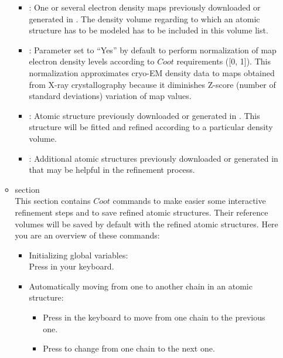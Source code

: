 \begin{itemize}
\begin{itemize}
    \begin{itemize}
     \item {}: One or several electron density maps previously downloaded or generated in \scipion. The density volume regarding to which an atomic structure has to be modeled has to be included in this volume list.\\
     \item {}: Parameter set to ``Yes'' by default to perform normalization of map electron density levels according to $Coot$ requirements ([0, 1]). This normalization approximates cryo-EM density data to maps obtained from X-ray crystallography because it diminishes Z-score (number of standard deviations) variation of map values.\\  
     \item {}: Atomic structure previously downloaded or generated in \scipion. This structure will be fitted and refined according to a particular density volume.\\
     \item {}: Additional atomic structures previously downloaded or generated in \scipion that may be helpful in the refinement process.\\
    \end{itemize}
    \item {} section\\
    This section contains $Coot$ commands to make easier some interactive refinement steps and to save refined atomic structures. Their reference volumes will be saved by default with the refined atomic structures. Here you are an overview of these commands:\\
    \begin{itemize}
     \item Initializing global variables:\\
     Press  in your keyboard.\\ 
     \item Automatically moving from one to another chain in an atomic structure:\\
     \begin{itemize}
      \item Press  in the keyboard to move from one chain to the previous one.\\
      \item Press  to change from one chain to the next one.\\

\end{itemize}
\end{itemize}
\end{itemize}
\end{itemize}
